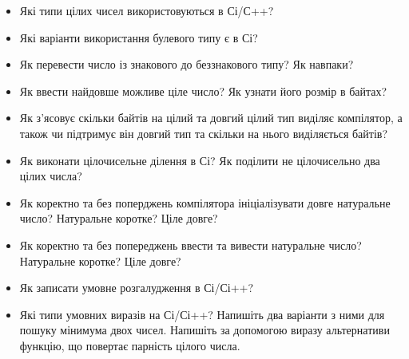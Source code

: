 \documentclass[]{article}
\begin{document}
\begin{itemize}
\item Які типи цілих чисел використовуються в Сі/С++?
\item Які варіанти використання булевого типу є в Сі?
\item Як перевести число із знакового до беззнакового типу? Як навпаки?
\item Як ввести найдовше можливе ціле число? Як узнати його розмір в
байтах?
\item Як з'ясовує скільки байтів на цілий та довгий
цілий тип виділяє компілятор, а також чи підтримує він довгий тип та
скільки на нього виділяється байтів?
\item Як виконати цілочисельне ділення в Сі? Як поділити не цілочисельно
два цілих числа?
\item Як коректно та без поперджень компілятора ініціалізувати довге
натуральне число? Натуральне коротке? Ціле довге?
\item Як коректно та без попереджень ввести та вивести натуральне число?
Натуральне коротке? Ціле довге?
\item Як записати умовне розгалудження в Сі/Сі++?
\item Які типи умовних виразів на Сі/Сі++? Напишіть два варіанти з ними для
пошуку мінимума двох чисел. Напишіть за допомогою виразу альтернативи
функцію, що повертає парність цілого числа.
\end{itemize}
\end{document}
